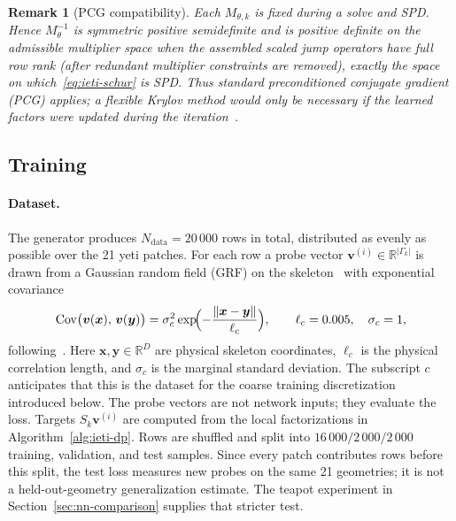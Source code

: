 \documentclass{article}
\newcommand{\vect}[1]{\boldsymbol{#1}}
\newcommand{\R}{\mathbb{R}}
\newcommand{\skel}{\Gamma} %
\newcommand{\Sloc}[1]{S_{#1}}                    %
\newcommand{\Pneural}{M_{\theta}^{-1}}            %
\theoremstyle{plain}
\newtheorem{rmk}{Remark}
\numberwithin{equation}{section}
\begin{document}
\begin{rmk}[PCG compatibility]
    \label{rmk:linearity}
    Each $M_{\theta,k}$ is fixed during a solve and SPD.  Hence
    $\Pneural$ is symmetric positive semidefinite and is positive definite on the
    admissible multiplier space when the assembled scaled jump operators have full
    row rank (after redundant multiplier constraints are removed), exactly the
    space on which~\eqref{eq:ieti-schur} is SPD.  Thus standard preconditioned
    conjugate gradient (PCG) applies; a
    flexible Krylov method would only be necessary if the learned factors were
    updated during the iteration~\cite{saad1993flexible}.
\end{rmk}

\subsection{Training}
\label{subsec:training}

\paragraph{Dataset.}
The generator produces $N_{\mathrm{data}}=20\,000$ rows in total,
distributed as evenly as possible over the 21 yeti patches.  For each row a
probe vector $\vect{v}^{(i)} \in \R^{|\skel_k|}$ is drawn from a Gaussian
random field (GRF) on the skeleton~\cite{adler2010geometry} with exponential
covariance
\begin{equation}
    \mathrm{Cov}\bigl(\vect{v}(\vect{x}),\, \vect{v}(\vect{y})\bigr)
    = \sigma_c^2 \exp\!\Bigl(-\frac{\|\vect{x}-\vect{y}\|}{\ell_c}\Bigr),
    \qquad \ell_c = 0.005,\quad \sigma_c = 1,
    \label{eq:grf-cov}
\end{equation}
following~\cite{kopanivcakova2025deeponet}.
Here $\vect{x},\vect{y}\in\R^D$ are physical skeleton coordinates,
$\ell_c$ is the physical correlation length, and $\sigma_c$ is the marginal
standard deviation.  The subscript $c$ anticipates that this is the dataset for
the coarse training discretization introduced below.
The probe vectors are not network inputs; they evaluate the loss.
Targets $\Sloc{k}\vect{v}^{(i)}$ are computed from the local factorizations in
Algorithm~\ref{alg:ieti-dp}.
Rows are shuffled and split into $16\,000/2\,000/2\,000$ training,
validation, and test samples.  Since every patch contributes rows before this
split, the test loss measures new probes on the same 21 geometries; it is not a
held-out-geometry generalization estimate.  The teapot experiment in
Section~\ref{sec:nn-comparison} supplies that stricter test.
\end{document}
